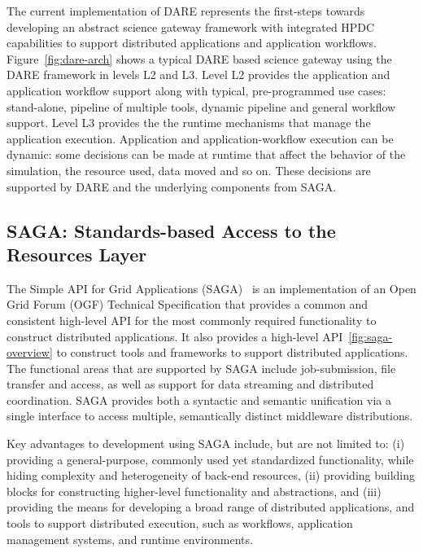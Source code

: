 \documentclass[]{svjour3}
\begin{document}
The current implementation of DARE represents the first-steps towards
developing an abstract science gateway framework with integrated HPDC
capabilities to support distributed applications and application
workflows. Figure~\ref{fig:dare-arch} shows a typical DARE based
science gateway using the DARE framework in levels L2 and L3. Level L2
provides the application and application workflow support along with
typical, pre-programmed use cases: stand-alone, pipeline of multiple
tools, dynamic pipeline and general workflow support. Level L3
provides the the runtime mechanisms that manage the application
execution. Application and application-workflow execution can be
dynamic: some decisions can be made at runtime that affect the
behavior of the simulation, the resource used, data moved and so
on. These decisions are supported by DARE and the underlying
components from SAGA.


\subsection{SAGA: Standards-based Access to the Resources Layer}

The Simple API for Grid Applications (SAGA)~\cite{saga_url} is an implementation
of an Open Grid Forum (OGF) Technical Specification that provides a common and
consistent high-level API for the most commonly required functionality to
construct distributed applications. It also provides a high-level API~\ref{fig:saga-overview}
to construct tools and frameworks to support distributed applications. The
functional areas that are supported by SAGA include job-submission, file transfer
and access, as well as support for data streaming and distributed coordination.
SAGA provides both a syntactic and semantic unification via a single interface to
access multiple, semantically distinct middleware distributions.

Key advantages to development using SAGA include, but are not limited to:
(i) providing a general-purpose, commonly used yet standardized functionality, while
hiding complexity and heterogeneity of back-end resources, (ii)
providing building blocks for constructing higher-level functionality
and abstractions, and (iii) providing the means for developing a broad
range of distributed applications, and tools to support distributed
execution, such as workflows, application management systems, and runtime environments.
\end{document}
